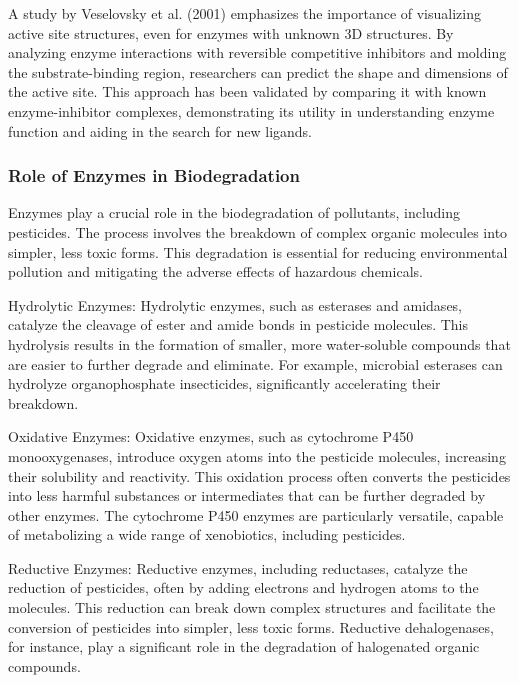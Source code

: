 A study by Veselovsky et al. (2001) emphasizes the importance of visualizing active site structures, even for enzymes with unknown 3D structures. By analyzing enzyme interactions with reversible competitive inhibitors and molding the substrate-binding region, researchers can predict the shape and dimensions of the active site. This approach has been validated by comparing it with known enzyme-inhibitor complexes, demonstrating its utility in understanding enzyme function and aiding in the search for new ligands.\autocite{veselovskyApproachVisualizationActive2001}

\subsubsection{Role of Enzymes in Biodegradation}
\label{sec:Role of Enzymes in Biodegradation}

Enzymes play a crucial role in the biodegradation of pollutants, including pesticides. The process involves the breakdown of complex organic molecules into simpler, less toxic forms. This degradation is essential for reducing environmental pollution and mitigating the adverse effects of hazardous chemicals.

Hydrolytic Enzymes: Hydrolytic enzymes, such as esterases and amidases, catalyze the cleavage of ester and amide bonds in pesticide molecules. This hydrolysis results in the formation of smaller, more water-soluble compounds that are easier to further degrade and eliminate. For example, microbial esterases can hydrolyze organophosphate insecticides, significantly accelerating their breakdown. \autocite{munneckeEnzymaticHydrolysisOrganophosphate1976a}

Oxidative Enzymes: Oxidative enzymes, such as cytochrome P450 monooxygenases, introduce oxygen atoms into the pesticide molecules, increasing their solubility and reactivity. This oxidation process often converts the pesticides into less harmful substances or intermediates that can be further degraded by other enzymes. The cytochrome P450 enzymes are particularly versatile, capable of metabolizing a wide range of xenobiotics, including pesticides. \autocite{belloTheoreticalApproachMechanism2000}

Reductive Enzymes: Reductive enzymes, including reductases, catalyze the reduction of pesticides, often by adding electrons and hydrogen atoms to the molecules. This reduction can break down complex structures and facilitate the conversion of pesticides into simpler, less toxic forms. Reductive dehalogenases, for instance, play a significant role in the degradation of halogenated organic compounds.

